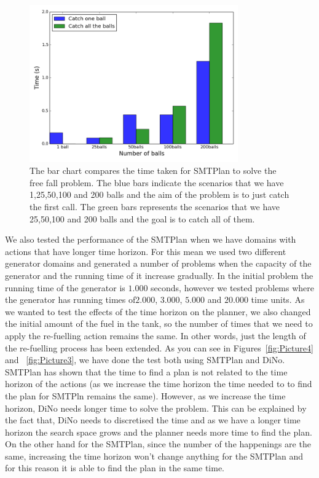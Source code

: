 \begin{figure}[!ht]
\centering
\includegraphics[width=0.80\textwidth]{diagrams/Balls.png}
\caption{The bar chart compares the time taken for SMTPlan to solve the free fall problem. The blue bars indicate the scenarios that we have 1,25,50,100 and 200 balls and the aim of the problem is to just catch the first call. The green bars represents the scenarios that we have 25,50,100 and 200 balls and the goal is to catch all of them.}
\label{fig:Picture1}
\end{figure}

We also tested the performance of the SMTPlan when we have domains with actions that have longer time horizon. For this mean we used two different generator domains and generated a number of problems when the capacity of the generator and the running time of it increase gradually. In the initial problem the running time of the generator is $\num{1.000}$ seconds, however we tested problems where the generator has running times of$\num{2.000}$, $\num{3.000}$, $\num{5.000}$ and $\num{20.000}$ time units. As we wanted to test the effects of the time horizon on the planner, we also changed the initial amount of the fuel in the tank, so the number of times that we need to apply the re-fuelling action remains the same. In other words, just the length of the re-fuelling process has been extended. As you can see in Figures~\ref{fig:Picture4} and ~\ref{fig:Picture3}, we have done the test both using SMTPlan and DiNo. SMTPlan has shown that the time to find a plan is not related to the time horizon of the actions (as we increase the time horizon the time needed to to find the plan for SMTPln remains the same). However, as we increase the time horizon, DiNo needs longer time to solve the problem. This can be explained by the fact that, DiNo needs to discretised the time and as we have a longer time horizon the search space grows and the planner needs more time to find the plan. On the other hand for the SMTPlan, since the number of the happenings are the same, increasing the time horizon won't change anything for the SMTPlan and for this reason it is able to find the plan in the same time.  

